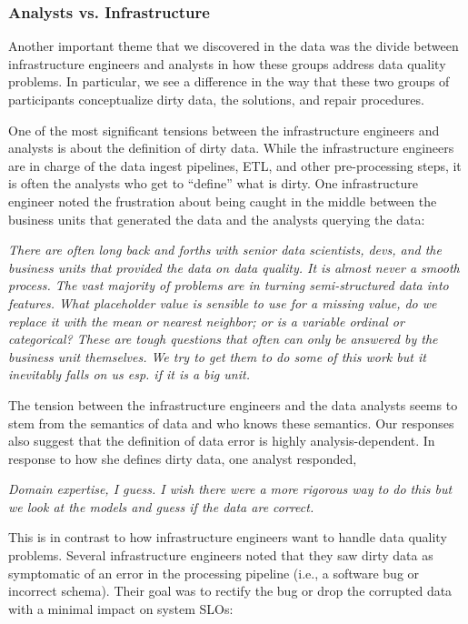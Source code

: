 \subsubsection{Analysts vs. Infrastructure}
Another important theme that we discovered in the data was the divide between infrastructure engineers and analysts in how these groups address data quality problems. In particular, we see a difference in the way that these two groups of participants conceptualize dirty data, the solutions, and repair procedures.

One of the most significant tensions between the infrastructure engineers and analysts is about the definition of dirty data. While the infrastructure engineers are in charge of the data ingest pipelines, ETL, and other pre-processing steps, it is often the analysts who get to ``define'' what is dirty. One infrastructure engineer noted the frustration about being caught in the middle between the business units that generated the data and the analysts querying the data:

\vspace{0.5em}
\emph{There are often long back and forths with senior data scientists, devs, and the business units that provided the data on data quality. It is almost never a smooth process. The vast majority of problems are in turning semi-structured data into features. What placeholder value is sensible to use for a missing value, do we replace it with the mean or nearest neighbor; or is a variable ordinal or categorical? These are tough questions that often can only be answered by the business unit themselves. We try to get them to do some of this work but it inevitably falls on us esp. if it is a big unit.}

\vspace{0.5em}

The tension between the infrastructure engineers and the data analysts seems to stem from the semantics of data and who knows these semantics. Our responses also suggest that the definition of data error is highly analysis-dependent. In response to how she defines dirty data, one analyst responded,

\vspace{0.5em}
\emph{Domain expertise, I guess. I wish there were a more rigorous way to do this but we look at the models and guess if the data are correct.}

\vspace{0.5em}

This is in contrast to how infrastructure engineers want to handle data quality problems. 
Several infrastructure engineers noted that they saw dirty data as symptomatic of an error in the processing pipeline (i.e., a software bug or incorrect schema). Their goal was to rectify the bug or drop the corrupted data with a minimal impact on system SLOs:


